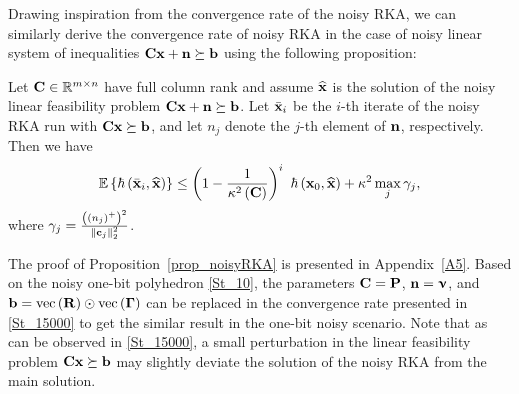\documentclass[12pt,draftcls,onecolumn]{IEEEtran}
\begin{document}
Drawing inspiration from the convergence rate of the noisy RKA, 
we can similarly derive the convergence rate of noisy RKA in the case of noisy linear system of inequalities
$\mathbf{C}\mathbf{x}+\mathbf{n}\succeq\mathbf{b}$ using the following proposition:
\begin{proposition}
\label{prop_noisyRKA}
Let
$\mathbf{C}\in\mathbb{R}^{m\times n}$ have full column rank and assume $\widehat{\mathbf{x}}$ is the solution of the noisy linear feasibility problem $\mathbf{C}\mathbf{x}+\mathbf{n}\succeq\mathbf{b}$. Let $\bar{\mathbf{x}}_{i}$ be the $i$-th iterate of the noisy RKA run with 
$\mathbf{C}\mathbf{x}\succeq\mathbf{b}$, and
let $n_j$ denote the $j$-th element of $\mathbf{n}$, respectively. Then we have
\begin{equation}
\label{St_15000}
\mathbb{E}\left\{\hbar\left(\bar{\mbx}_{i},\widehat{\mbx}\right)\right\} \leq \left(1-\frac{1}{\kappa^{2}\left(\mbC\right)}\right)^{i}~ \hbar\left(\mathbf{x}_{0},\widehat{\mbx}\right)+\kappa^2\max_{j}\gamma_j,
\end{equation}\normalsize
where $\gamma_j=\frac{\left(\left(n_j\right)^{+}\right)^2}{\left\|\mathbf{c}_j\right\|^2_2}$.
\end{proposition}
The proof of Proposition~\ref{prop_noisyRKA} is presented in Appendix~\ref{A5}.
Based on the noisy one-bit polyhedron \eqref{St_10}, the parameters $\mathbf{C}=\mathbf{P}$, $\mathbf{n}=\boldsymbol{\upnu}$, and $\mathbf{b}=\operatorname{vec}\left(\mathbf{R}\right)\odot \operatorname{vec}\left(\boldsymbol{\Gamma}\right)$ can be replaced in the convergence rate presented in \eqref{St_15000} to get the similar result in the one-bit noisy scenario. Note that as can be observed in \eqref{St_15000}, a small perturbation in the linear feasibility problem $\mathbf{C}\mathbf{x}\succeq\mathbf{b}$ may slightly deviate the solution of the noisy RKA from the main solution.
\end{document}

